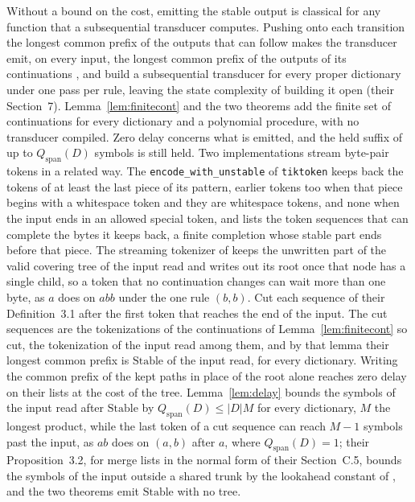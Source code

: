 \documentclass[11pt,a4paper]{article}
\theoremstyle{definition}
\theoremstyle{plain}
\newcommand{\code}[1]{\texttt{#1}}
\newcommand{\Stable}{\mathrm{Stable}}
\begin{document}
Without a bound on the cost, emitting the stable output is classical for any function that a subsequential transducer
computes. Pushing onto each transition the longest common prefix of the outputs that can follow makes the transducer
emit, on every input, the longest common prefix of the outputs of its continuations \citep[Sections~2 and~3, pp.~205
and~207]{mohri1994compact}, and \citet[Theorem~4]{berglund2024dfa} build a subsequential transducer for every proper
dictionary under one pass per rule, leaving the state complexity of building it open (their Section~7).
Lemma~\ref{lem:finitecont} and the two theorems add the finite set of continuations for every dictionary and a
polynomial procedure, with no transducer compiled. Zero delay concerns what is emitted, and the held suffix of up to
\(Q_{\mathrm{span}}(D)\) symbols is still held. Two implementations stream byte-pair tokens in a related way. The
\code{encode\_with\_unstable} of \code{tiktoken} \citep{openai2023tiktoken} keeps back the tokens of at least the last
piece of its pattern, earlier tokens too when that piece begins with a whitespace token and they are whitespace tokens,
and none when the input ends in an allowed special token, and lists the token sequences that can complete the bytes it
keeps back, a finite completion whose stable part ends before that piece. The streaming tokenizer of \citet[Section~3.5
and Algorithm~2]{hayase2025bytesampler} keeps the unwritten part of the valid covering tree of the input read and writes
out its root once that node has a single child, so a token that no continuation changes can wait more than one byte, as
\(a\) does on \(abb\) under the one rule \((b, b)\). Cut each sequence of their Definition~3.1 after the first token
that reaches the end of the input. The cut sequences are the tokenizations of the continuations of
Lemma~\ref{lem:finitecont} so cut, the tokenization of the input read among them, and by that lemma their longest common
prefix is \(\Stable\) of the input read, for every dictionary. Writing the common prefix of the kept paths in place of
the root alone reaches zero delay on their lists at the cost of the tree. Lemma~\ref{lem:delay} bounds the symbols of
the input read after \(\Stable\) by \(Q_{\mathrm{span}}(D) \le |D|M\) for every dictionary, \(M\) the longest product,
while the last token of a cut sequence can reach \(M - 1\) symbols past the input, as \(ab\) does on \((a, b)\) after
\(a\), where \(Q_{\mathrm{span}}(D) = 1\); their Proposition~3.2, for merge lists in the normal form of their
Section~C.5, bounds the symbols of the input outside a shared trunk by the lookahead constant of
\citet{berglund2023formalizing}, and the two theorems emit \(\Stable\) with no tree.
\end{document}
